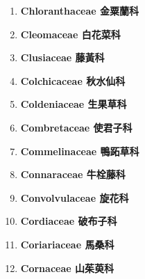 \begin{enumerate}
        
      \item[] \begin{small}\textbf{Chloranthaceae 金粟蘭科} \end{small}
        
      \item[] \begin{small}\textbf{Cleomaceae 白花菜科} \end{small}
        
      \item[] \begin{small}\textbf{Clusiaceae 藤黃科} \end{small}
        
      \item[] \begin{small}\textbf{Colchicaceae 秋水仙科} \end{small}
        
      \item[] \begin{small}\textbf{Coldeniaceae 生果草科} \end{small}
        
      \item[] \begin{small}\textbf{Combretaceae 使君子科} \end{small}
        
      \item[] \begin{small}\textbf{Commelinaceae 鴨跖草科} \end{small}
        
      \item[] \begin{small}\textbf{Connaraceae 牛栓藤科} \end{small}
        
      \item[] \begin{small}\textbf{Convolvulaceae 旋花科} \end{small}
        
      \item[] \begin{small}\textbf{Cordiaceae 破布子科} \end{small}
        
      \item[] \begin{small}\textbf{Coriariaceae 馬桑科} \end{small}
        
      \item[] \begin{small}\textbf{Cornaceae 山茱萸科} \end{small}

\end{enumerate}
